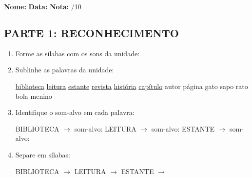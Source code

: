 \begin{exercicio}

\noindent\textbf{Nome:} \underline{\hspace{3.2cm}} \quad \textbf{Data:} \underline{\hspace{1.6cm}} \quad \textbf{Nota:} \underline{\hspace{0.9cm}}/10


\subsection*{PARTE 1: RECONHECIMENTO}

\begin{enumerate}

  \item Forme as sílabas com os sons da unidade:

\begin{center}
\end{center}

  \item Sublinhe as palavras da unidade:

\begin{center}
  \uline{biblioteca} \quad \uline{leitura} \quad \uline{estante} \quad \uline{revista} \quad \uline{história} \quad \uline{capítulo} \quad autor \quad página \quad gato \quad sapo \quad rato \quad bola \quad menino
\end{center}

  \item Identifique o som-alvo em cada palavra:
  \begin{center}
  BIBLIOTECA $\rightarrow$ som-alvo: \underline{\hspace{1cm}} \quad LEITURA $\rightarrow$ som-alvo: \underline{\hspace{1cm}} \quad ESTANTE $\rightarrow$ som-alvo: \underline{\hspace{1cm}}
  \end{center}

  \item Separe em sílabas:
  \begin{center}
  BIBLIOTECA $\rightarrow$ \underline{\hspace{1cm}} \quad LEITURA $\rightarrow$ \underline{\hspace{1cm}} \quad ESTANTE $\rightarrow$ \underline{\hspace{1cm}}
  \end{center}


\end{enumerate}
\end{exercicio}
